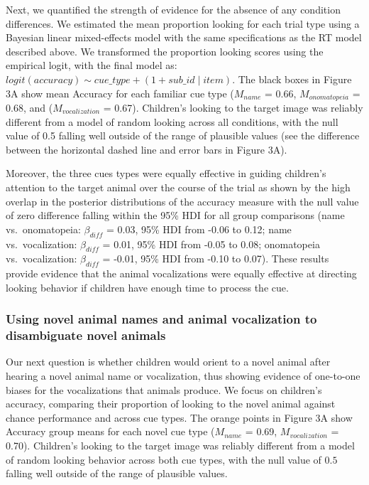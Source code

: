 \documentclass[english,floatsintext,man]{apa6}
\theoremstyle{definition}
\theoremstyle{definition}
\theoremstyle{definition}
\theoremstyle{remark}
\begin{document}
Next, we quantified the strength of evidence for the absence of any
condition differences. We estimated the mean proportion looking for each
trial type using a Bayesian linear mixed-effects model with the same
specifications as the RT model described above. We transformed the
proportion looking scores using the empirical logit, with the final
model as: \(logit(accuracy) \sim cue\_type + (1 + sub\_id \mid item)\).
The black boxes in Figure 3A show mean Accuracy for each familiar cue
type (\(M_{name}\) = 0.66, \(M_{onomatopeia}\) = 0.68, and
(\(M_{vocalization}\) = 0.67). Children's looking to the target image
was reliably different from a model of random looking across all
conditions, with the null value of 0.5 falling well outside of the range
of plausible values (see the difference between the horizontal dashed
line and error bars in Figure 3A).

Moreover, the three cues types were equally effective in guiding
children's attention to the target animal over the course of the trial
as shown by the high overlap in the posterior distributions of the
accuracy measure with the null value of zero difference falling within
the 95\% HDI for all group comparisons (name vs.~onomatopeia:
\(\beta_{diff}\) = 0.03, 95\% HDI from -0.06 to 0.12; name
vs.~vocalization: \(\beta_{diff}\) = 0.01, 95\% HDI from -0.05 to 0.08;
onomatopeia vs.~vocalization: \(\beta_{diff}\) = -0.01, 95\% HDI from
-0.10 to 0.07). These results provide evidence that the animal
vocalizations were equally effective at directing looking behavior if
children have enough time to process the cue.

\hypertarget{using-novel-animal-names-and-animal-vocalization-to-disambiguate-novel-animals}{%
\subsubsection{Using novel animal names and animal vocalization to
disambiguate novel
animals}\label{using-novel-animal-names-and-animal-vocalization-to-disambiguate-novel-animals}}

Our next question is whether children would orient to a novel animal
after hearing a novel animal name or vocalization, thus showing evidence
of one-to-one biases for the vocalizations that animals produce. We
focus on children's accuracy, comparing their proportion of looking to
the novel animal against chance performance and across cue types. The
orange points in Figure 3A show Accuracy group means for each novel cue
type (\(M_{name}\) = 0.69, \(M_{vocalization}\) = 0.70). Children's
looking to the target image was reliably different from a model of
random looking behavior across both cue types, with the null value of
\(0.5\) falling well outside of the range of plausible values.
\end{document}

